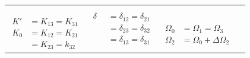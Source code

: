 \documentclass[../main.tex]{subfiles}
\begin{document}
\begin{table}[h]
\begin{tabular}{|c|c|c|c|}
    &
    \multirow{8}{3cm}{\centering
    $\begin{aligned}
        \delta &= \delta_{12} = \delta_{21} \\
        \quad  &= \delta_{23} = \delta_{32} \\
        \quad  &=  \delta_{13} = \delta_{31}
    \end{aligned}$ } 
    \\ 
    & & & %
    \\ \cline{2-2}
    & \multirow{2}{2.5cm}{\centering $K'= 0.25K_0$} & & 
    \\
    \multirow{5}{3cm}{\centering
    $\begin{aligned}
        K' &= K_{13}=K_{31}\\
        K_0 &=K_{12}=K_{21}\\
        \quad &= K_{23}=k_{32}
    \end{aligned}$
    }
    & & & %
    \\  \cline{2-2}
    &  
    \multirow{2}{2.5cm}{\centering $K'= 0.50K_0$}
    &  
    \multirow{4}{3cm}{\centering
    $\begin{aligned}
    \Omega_0 &= \Omega_1 = \Omega_3 \\
    \Omega_2 &= \Omega_0 + \Delta\Omega_2
    \end{aligned}$
    }
    & 
    \\  
    & & &  %
    \\ \cline{2-2}
    & \multirow{2}{2.5cm}{\centering $K' = 0.75K_0$} & & 
    \\    
    & & & %
    \\ 
\hline
\end{tabular}
\label{tab:circuits}
\end{table}
\end{document}
